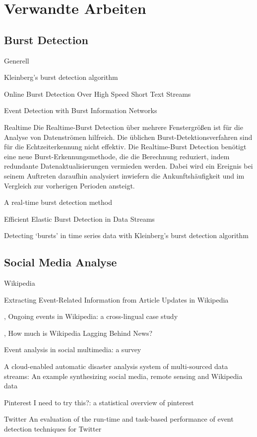\section{Verwandte Arbeiten}
\subsection{Burst Detection}
Generell

Kleinberg’s burst detection algorithm

Online Burst Detection Over High Speed Short Text Streams
\cite{yuan2007online}


Event Detection with Burst Information Networks
\cite{ge2016event}

Realtime
Die Realtime-Burst Detection über mehrere Fenstergrößen ist für die Analyse von Datenströmen hilfreich. Die üblichen Burst-Detektionsverfahren sind für die Echtzeiterkennung nicht effektiv. Die Realtime-Burst Detection benötigt eine neue Burst-Erkennungsmethode, die die Berechnung reduziert, indem redundante Datenaktualisierungen vermieden werden. Dabei wird ein Ereignis bei seinem Auftreten daraufhin analysiert inwiefern die Ankunftshäufigkeit und im Vergleich zur vorherigen Perioden ansteigt.

\cite{ebina2011real}
A real-time burst detection method

Efficient Elastic Burst Detection in Data Streams 
\cite{Zhu:2003:EEB:956750.956789}

Detecting ‘bursts’ in time series data with Kleinberg’s burst detection algorithm
\cite{kleinberg1}

\subsection{Social Media Analyse}

Wikipedia

Extracting Event-Related Information from
Article Updates in Wikipedia
\cite{10.1007978-3-642-36973-5_22}


\cite{gottschalk2017ongoing},
  Ongoing events in Wikipedia: a cross-lingual case study

\cite{fetahu2015much},
  How much is Wikipedia Lagging Behind News?

\cite{liu2016event}
  Event analysis in social multimedia: a survey

A cloud-enabled automatic disaster analysis system of multi-sourced data streams: An example synthesizing social media, remote sensing and Wikipedia data
\cite{huang2017cloud}

Pinterest
I need to try this?: a statistical overview of pinterest
\cite{gilbert2013need}

Twitter
An evaluation of the run-time and task-based performance of event detection techniques for Twitter
\cite{weiler2016evaluation}
